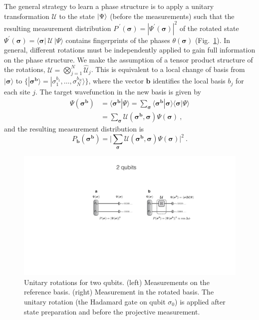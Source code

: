 \documentclass[submission, Phys, hidelnks]{SciPost}
\begin{document}
The general strategy to learn a phase structure is to apply a unitary
transformation $\bm{\mathcal{U}}$ to the state $\ket{\Psi}$ (before the
measurements) such that the resulting measurement distribution
$P^{\:\prime}(\bm{\sigma})=|\Psi^\prime(\bm{\sigma})|^2$ of the rotated state
$\Psi^\prime(\bm{\sigma})=\langle\bm{\sigma}|\:\bm{\mathcal{U}}\:|\Psi\rangle$
contains fingerprints of the phases $\theta(\bm{\sigma})$
(Fig.~\ref{phase_learn}). In general, different rotations must be independently
applied to gain full information on the phase structure. We make the assumption
of a tensor product structure of the rotations,
$\bm{\mathcal{U}}=\bigotimes_{j=1}^N\hat{\mathcal{U}}_j$. This is equivalent to
a local change of basis from $|\bm{\sigma}\rangle$ to
$\lbrace|\bm{\sigma}^{\bm{b}}\rangle=|\sigma_1^{b_1},\dots,\sigma_N^{b_N}\rangle\rbrace$,
where the vector $\bm{b}$ identifies the local basis $b_j$ for each site $j$.
The target wavefunction in the new basis is given by
\begin{equation}
\begin{split}
    \Psi(\bm{\sigma}^{\bm{b}})
    &=\langle \bm{\sigma}^{\bm{b}}|\Psi\rangle=\sum_{\bm{\sigma}}\langle \bm{\sigma}^{\bm{b}}|\bm{\sigma}\rangle\langle\bm{\sigma}|\Psi\rangle\\
    &=\sum_{\bm{\sigma}}\bm{\mathcal{U}}(\bm{\sigma}^{\bm{b}},\bm{\sigma})\Psi(\bm{\sigma})\:,
\end{split}
\end{equation}
and the resulting measurement distribution is
\begin{equation}
    P_{\bm{b}}(\bm{\sigma}^{\bm{b}})=\bigg|\sum_{\bm{\sigma}}\bm{\mathcal{U}}(\bm{\sigma}^{\bm{b}},\bm{\sigma})\Psi(\bm{\sigma})\bigg|^2\:.
\end{equation}

\begin{figure}[htb]
    \centering
    \includegraphics[width=\columnwidth, trim={0 0 0 40}, clip]{2qubits_rotation}
    \caption{
        Unitary rotations for two qubits. (left) Measurements on the reference
        basis. (right) Measurement in the rotated basis. The unitary rotation
        (the Hadamard gate on qubit $\sigma_0$) is applied after state
        preparation and before the projective measurement.
    }\label{phase_learn}
\end{figure}
\end{document}
